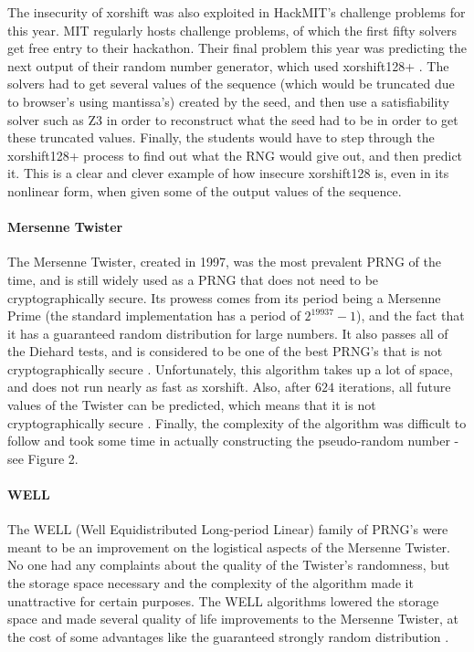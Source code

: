 \documentclass[11pt]{article}
\begin{document}
The insecurity of xorshift was also exploited in HackMIT's challenge problems for this year. MIT regularly hosts challenge problems, of which the first fifty solvers get free entry to their hackathon. Their final problem this year was predicting the next output of their random number generator, which used xorshift128+ \cite{hackMIT}. The solvers had to get several values of the sequence (which would be truncated due to browser's using mantissa's) created by the seed, and then use a satisfiability solver such as Z3 in order to reconstruct what the seed had to be in order to get these truncated values. Finally, the students would have to step through the xorshift128+ process to find out what the RNG would give out, and then predict it. This is a clear and clever example of how insecure xorshift128 is, even in its nonlinear form, when given some of the output values of the sequence.  
\paragraph{Mersenne Twister}
The Mersenne Twister, created in 1997, was the most prevalent PRNG of the time, and is still widely used as a PRNG that does not need to be cryptographically secure. Its prowess comes from its period being a Mersenne Prime (the standard implementation has a period of $2^{19937}-1$), and the fact that it has a guaranteed random distribution for large numbers. It also passes all of the Diehard tests, and is considered to be one of the best PRNG's that is not cryptographically secure \cite{Mers}.  Unfortunately, this algorithm takes up a lot of space, and does not run nearly as fast as xorshift. Also, after $624$ iterations, all future values of the Twister can be predicted, which means that it is not cryptographically secure \cite{Well}. Finally, the complexity of the algorithm was difficult to follow and took some time in actually constructing the pseudo-random number - see Figure 2. 
\paragraph{WELL} The WELL (Well Equidistributed Long-period Linear) family of PRNG's were meant to be an improvement on the logistical aspects of the Mersenne Twister. No one had any complaints about the quality of the Twister's randomness, but the storage space necessary and the complexity of the algorithm made it unattractive for certain purposes. The WELL algorithms lowered the storage space and made several quality of life improvements to the Mersenne Twister, at the cost of some advantages like the guaranteed strongly random distribution \cite{Well}. 
\end{document}
